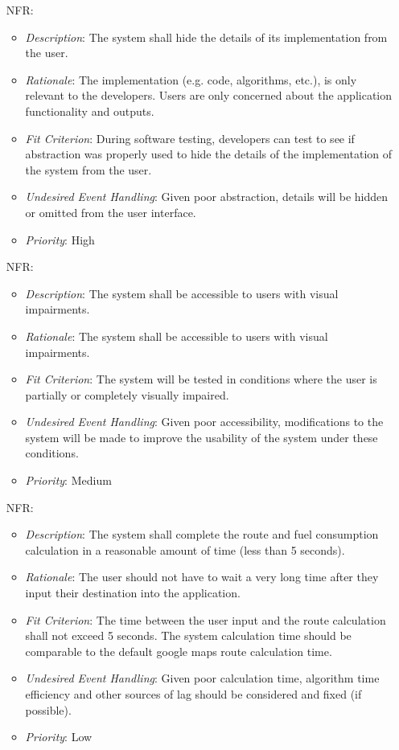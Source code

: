 \documentclass[12pt]{article}
\newcounter{nfrnum} %
\begin{document}
\begin{itemize}
\item[NFR\refstepcounter{nfrnum}\thenfrnum \label{NFR_6}:] 
\begin{itemize}
  \item \textit{Description}: The system shall hide the details of its implementation from the user.
  \item \textit{Rationale}: The implementation (e.g. code, algorithms, etc.), is only relevant to the developers. Users are only concerned about the application functionality and outputs.
  \item \textit{Fit Criterion}: During software testing, developers can test to see if abstraction was properly used to hide the details of the implementation of the system from the user.  
  \item \textit{Undesired Event Handling}: Given poor abstraction, details will be hidden or omitted from the user interface. 
  \item \textit{Priority}: High
\end{itemize}

\item[NFR\refstepcounter{nfrnum}\thenfrnum \label{NFR_7}:] 
\begin{itemize}
  \item \textit{Description}: The system shall be accessible to users with visual impairments. 
  \item \textit{Rationale}: The system shall be accessible to users with visual impairments. 
  \item \textit{Fit Criterion}: The system will be tested in conditions where the user is partially or completely visually impaired. 
  \item \textit{Undesired Event Handling}: Given poor accessibility, modifications to the system will be made to improve the usability of the system under these conditions.
  \item \textit{Priority}: Medium
\end{itemize}

\item[NFR\refstepcounter{nfrnum}\thenfrnum \label{NFR_8}:] 
\begin{itemize}
  \item \textit{Description}: The system shall complete the route and fuel consumption calculation in a reasonable amount of time (less than 5 seconds). 
  \item \textit{Rationale}: The user should not have to wait a very long time after they input their destination into the application.
  \item \textit{Fit Criterion}: The time between the user input and the route calculation shall not exceed 5 seconds. The system calculation time should be comparable to the default google maps route calculation time.  
  \item \textit{Undesired Event Handling}: Given poor calculation time, algorithm time efficiency and other sources of lag should be considered and fixed (if possible). 
  \item \textit{Priority}: Low
\end{itemize}


\end{itemize}
\end{document}
